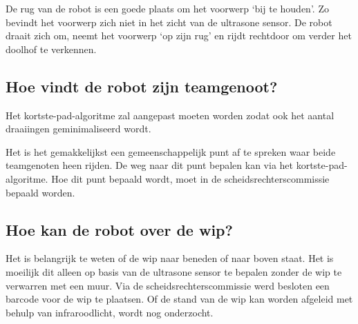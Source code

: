 \documentclass{peno}
\begin{document}
De rug van de robot is een goede plaats om het voorwerp `bij te houden'. Zo bevindt het voorwerp zich niet in het zicht van de ultrasone sensor. De robot draait zich om, neemt het voorwerp `op zijn rug' en rijdt rechtdoor om verder het doolhof te verkennen.


\subsection*{Hoe vindt de robot zijn teamgenoot?}
Het kortste-pad-algoritme zal aangepast moeten worden zodat ook het aantal draaiingen geminimaliseerd wordt.

Het is het gemakkelijkst een gemeenschappelijk punt af te spreken waar beide teamgenoten heen rijden. De weg naar dit punt bepalen kan via het kortste-pad-algoritme. Hoe dit punt bepaald wordt, moet in de scheidsrechterscommissie bepaald worden.


\subsection*{Hoe kan de robot over de wip?}
Het is belangrijk te weten of de wip naar beneden of naar boven staat. Het is moeilijk dit alleen op basis van de ultrasone sensor te bepalen zonder de wip te verwarren met een muur. Via de scheidsrechterscommissie werd besloten een barcode voor de wip te plaatsen. Of de stand van de wip kan worden afgeleid met behulp van infraroodlicht, wordt nog onderzocht.
\end{document}
